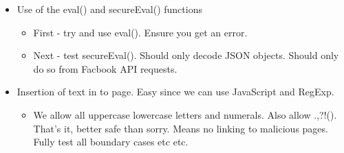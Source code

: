     \begin{itemize}
    
    \item Use of the eval() and secureEval() functions
    \begin{itemize}
        \item First - try and use eval(). Ensure you get an error.
        \item Next - test secureEval(). Should only decode JSON objects. Should only do so from Facbook API requests.
    \end{itemize}
    
    \item Insertion of text in to page. Easy since we can use JavaScript and RegExp.
    \begin{itemize}
        \item We allow all uppercase lowercase letters and numerals. Also allow .,?!(). That's it, better safe than sorry. Means no linking to malicious pages. Fully test all boundary cases etc etc.
    \end{itemize}
    

\end{itemize}
